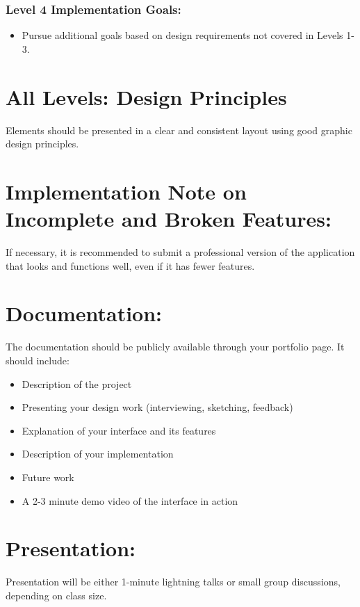 \documentclass{article}
\begin{document}
\subsubsection*{Level 4 Implementation Goals:}
\begin{itemize}
    \item Pursue additional goals based on design requirements not covered in Levels 1-3.
\end{itemize}

\section*{All Levels: Design Principles}
Elements should be presented in a clear and consistent layout using good graphic design principles. 

\section*{Implementation Note on Incomplete and Broken Features:}
If necessary, it is recommended to submit a professional version of the application that looks and functions well, even if it has fewer features.

\section*{Documentation:}
The documentation should be publicly available through your portfolio page. It should include:
\begin{itemize}
    \item Description of the project
    \item Presenting your design work (interviewing, sketching, feedback)
    \item Explanation of your interface and its features
    \item Description of your implementation
    \item Future work
    \item A 2-3 minute demo video of the interface in action
\end{itemize}

\section*{Presentation:}
Presentation will be either 1-minute lightning talks or small group discussions, depending on class size.
\end{document}
